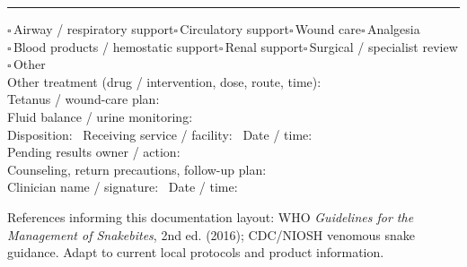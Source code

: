 \documentclass[10pt,a4paper]{article}
\newcommand{\boxx}{\ensuremath{\square}}
\newcommand{\checkitem}[1]{\boxx\,#1\quad}
\newcommand{\linefield}[2]{#1\ \underline{\hspace{#2}}}
\newcommand{\sectionbar}[1]{\vspace{3pt}{\large\bfseries #1}\par\vspace{1pt}\hrule\vspace{3pt}}
\begin{document}
\sectionbar{9. Supportive care, disposition, and follow-up}
\checkitem{Airway / respiratory support}\checkitem{Circulatory support}\checkitem{Wound care}\checkitem{Analgesia}\\
\checkitem{Blood products / hemostatic support}\checkitem{Renal support}\checkitem{Surgical / specialist review}\checkitem{Other}\\
\linefield{Other treatment (drug / intervention, dose, route, time):}{4.4cm}\\
\linefield{Tetanus / wound-care plan:}{5.0cm}\\
\linefield{Fluid balance / urine monitoring:}{5.5cm}\\
\linefield{Disposition:}{2.5cm} \linefield{Receiving service / facility:}{5.0cm} \linefield{Date / time:}{2.4cm}\\
\linefield{Pending results owner / action:}{5.5cm}\\
\linefield{Counseling, return precautions, follow-up plan:}{5.5cm}\\
\linefield{Clinician name / signature:}{6.0cm} \linefield{Date / time:}{3.5cm}

\vfill
\footnotesize References informing this documentation layout: WHO \textit{Guidelines for the Management of Snakebites}, 2nd ed. (2016); CDC/NIOSH venomous snake guidance. Adapt to current local protocols and product information.
\end{document}
